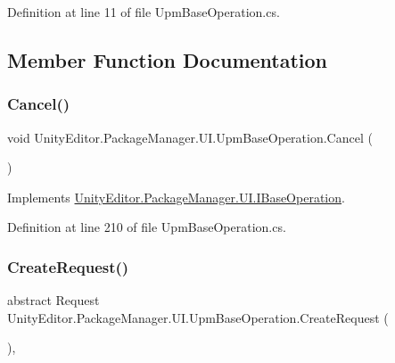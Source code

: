 Definition at line 11 of file Upm\+Base\+Operation.\+cs.



\subsection{Member Function Documentation}
\mbox{\label{class_unity_editor_1_1_package_manager_1_1_u_i_1_1_upm_base_operation_a4e52e6586c22b12c9b25f905f6fd2a25}} 
\subsubsection{\texorpdfstring{Cancel()}{Cancel()}}
{\footnotesize\ttfamily void Unity\+Editor.\+Package\+Manager.\+U\+I.\+Upm\+Base\+Operation.\+Cancel (\begin{DoxyParamCaption}{ }\end{DoxyParamCaption})}



Implements \mbox{\hyperlink{interface_unity_editor_1_1_package_manager_1_1_u_i_1_1_i_base_operation_ab924259fe1ff324c238ae37c96c42c1e}{Unity\+Editor.\+Package\+Manager.\+U\+I.\+I\+Base\+Operation}}.



Definition at line 210 of file Upm\+Base\+Operation.\+cs.

\mbox{\label{class_unity_editor_1_1_package_manager_1_1_u_i_1_1_upm_base_operation_ae4b93c7bf7b6eb994082e78cb146f793}} 
\subsubsection{\texorpdfstring{CreateRequest()}{CreateRequest()}}
{\footnotesize\ttfamily abstract Request Unity\+Editor.\+Package\+Manager.\+U\+I.\+Upm\+Base\+Operation.\+Create\+Request (\begin{DoxyParamCaption}{ }\end{DoxyParamCaption})\hspace{0.3cm}{\ttfamily [protected]}, {}}



